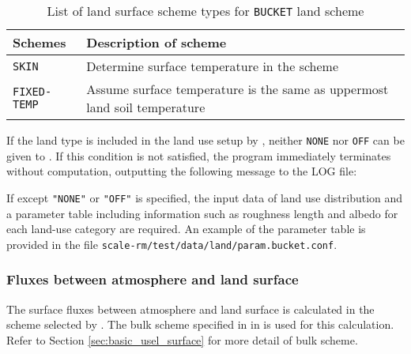 \begin{table}[hbt]
\begin{center}
  \caption{List of land surface scheme types for \texttt{BUCKET} land scheme}
  \label{tab:nml_land_sfc}
  \begin{tabularx}{150mm}{lX} \hline
    \rowcolor[gray]{0.9}  Schemes & Description of scheme \\ \hline
      \verb|SKIN|       & Determine surface temperature in the scheme \\
      \verb|FIXED-TEMP| & Assume surface temperature is the same as uppermost land soil temperature \\
    \hline
  \end{tabularx}
\end{center}
\end{table}

If the land type is included in the land use setup by , neither \verb|NONE| nor \verb|OFF| can be given to . If this condition is not satisfied, the program immediately terminates without computation, outputting the following message to the LOG file:

If  except \verb|"NONE"| or \verb|"OFF"| is specified,
the input data of land use distribution and a parameter table including information such as roughness length and albedo for each land-use category are required.
An example of the parameter table is provided
in the file \verb|scale-rm/test/data/land/param.bucket.conf|.\\

\subsubsection{Fluxes between atmosphere and land surface}
The surface fluxes between atmosphere and land surface is calculated in the scheme selected by . The bulk scheme specified in  in  is used for this calculation. Refer to Section \ref{sec:basic_usel_surface} for more detail of bulk scheme.


